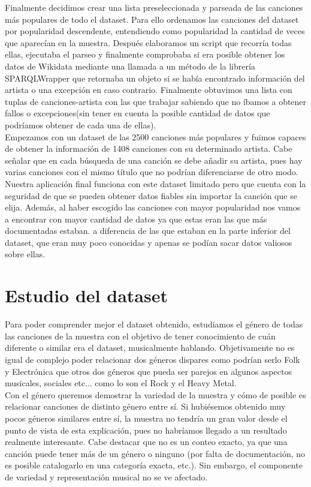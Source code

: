 Finalmente decidimos crear una lista preseleccionada y parseada de las canciones más populares de todo el dataset. Para ello ordenamos las canciones del dataset por popularidad descendente, entendiendo como popularidad la cantidad de veces que aparecían en la muestra. Después elaboramos un script que recorría todas ellas, ejecutaba el parseo y finalmente comprobaba si era posible obtener los datos de Wikidata mediante una llamada a un método de la librería SPARQLWrapper que retornaba un objeto si se había encontrado información del artista o una excepción en caso contrario. Finalmente obtuvimos una lista con tuplas de canciones-artista con las que trabajar sabiendo que no íbamos a obtener fallos o excepciones(sin tener en cuenta la posible cantidad de datos que podríamos obtener de cada una de ellas).\\

Empezamos con un dataset de las 2500 canciones más populares y fuimos capaces de obtener la información de 1408 canciones con su determinado artista. Cabe señalar que en cada búsqueda de una canción se debe añadir su artista, pues hay varias canciones con el mismo título que no podrían diferenciarse de otro modo.\\

Nuestra aplicación final funciona con este dataset limitado pero que cuenta con la seguridad de que se pueden obtener datos fiables sin importar la canción que se elija. Además, al haber escogido las canciones con mayor popularidad nos vamos a encontrar con mayor cantidad de datos ya que estas eran las que más documentadas estaban. a diferencia de las que estaban en la parte inferior del dataset, que eran muy poco conocidas y apenas se podían sacar datos valiosos sobre ellas.

\section{Estudio del dataset}

Para poder comprender mejor el dataset obtenido, estudiamos el género de todas las canciones de la muestra con el objetivo de tener conocimiento de cuán diferente o similar era el dataset, musicalmente hablando. Objetivamente no es igual de complejo poder relacionar dos géneros dispares como podrían serlo Folk y Electrónica que otros dos géneros que pueda ser parejos en algunos aspectos musicales, sociales etc... como lo son el Rock y el Heavy Metal.\\

Con el género queremos demostrar la variedad de la muestra y cómo de posible es relacionar canciones de distinto género entre sí. Si hubiésemos obtenido muy pocos géneros similares entre sí, la muestra no tendría un gran valor desde el punto de vista de esta explicación, pues no habríamos llegado a un resultado realmente interesante. Cabe destacar que no es un conteo exacto, ya que una canción puede tener más de un género o ninguno (por falta de documentación, no es posible catalogarlo en una categoría exacta, etc.). Sin embargo, el componente de variedad y representación musical no se ve afectado.

